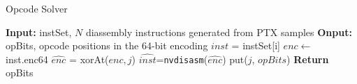 \begin{algorithm}[htbp]
      \caption{Opcode Solver}\label{algo:opcode}
      {\small
      \begin{algorithmic}[1]
      \State \textbf {Input:} instSet, $N$ diassembly instructions generated from PTX samples
      \State \textbf {Onput:} opBits, opcode positions in the 64-bit encoding
      \State $inst$ = instSet[i]
      \State $enc \gets$ inst.enc64
      \State $\widehat{enc}$ = xorAt($enc, j$)
      \State $\widehat{inst}$={\tt nvdisasm}($\widehat{enc}$)
      \State put($j$, $opBits$)
      \EndIf
      \EndFor
      \EndFor
      \State \textbf{Return} opBits 
  \end{algorithmic}
  }
\end{algorithm}

